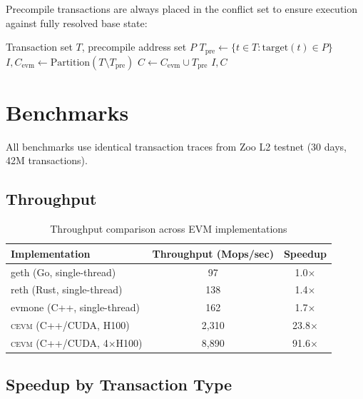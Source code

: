 \documentclass[11pt,letterpaper]{article}
\theoremstyle{definition}
\theoremstyle{remark}
\newcommand{\cevm}{\textsc{cevm}}
\begin{document}
Precompile transactions are always placed in the conflict set to ensure execution against fully resolved base state:

\begin{algorithm}
\caption{Precompile-Aware Partitioning}
\label{alg:precompile}
\begin{algorithmic}[1]
\REQUIRE Transaction set $T$, precompile address set $P$
\STATE $T_{\text{pre}} \gets \{t \in T : \text{target}(t) \in P\}$
\STATE $I, C_{\text{evm}} \gets \text{Partition}(T \setminus T_{\text{pre}})$
\STATE $C \gets C_{\text{evm}} \cup T_{\text{pre}}$
\RETURN $I, C$
\end{algorithmic}
\end{algorithm}

\section{Benchmarks}
\label{sec:benchmarks}

All benchmarks use identical transaction traces from Zoo L2 testnet (30 days, 42M transactions).

\subsection{Throughput}

\begin{table}[h]
\centering
\begin{tabular}{lcc}
\toprule
\textbf{Implementation} & \textbf{Throughput (Mops/sec)} & \textbf{Speedup} \\
\midrule
geth (Go, single-thread) & 97 & 1.0$\times$ \\
reth (Rust, single-thread) & 138 & 1.4$\times$ \\
evmone (C++, single-thread) & 162 & 1.7$\times$ \\
\cevm{} (C++/CUDA, H100) & 2,310 & 23.8$\times$ \\
\cevm{} (C++/CUDA, 4$\times$H100) & 8,890 & 91.6$\times$ \\
\bottomrule
\end{tabular}
\caption{Throughput comparison across EVM implementations}
\label{tab:throughput}
\end{table}

\subsection{Speedup by Transaction Type}
\end{document}
